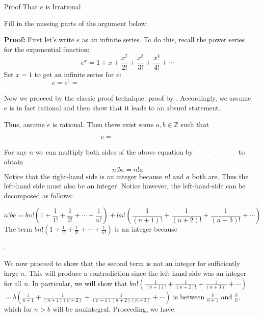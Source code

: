 \begin{exercise}{Proof That $e$ is Irrational \Coffeecup \Coffeecup \Coffeecup}

Fill in the missing parts of the argument below:

\vspace*{.2in}

{\bf Proof:} First let's write $e$ as an infinite series.  To do this, recall the power series for the exponential function:  $$ e^x = 1+x+\frac{x^2}{2!}+\frac{x^3}{3!}+\frac{x^4}{4!}+ \cdots $$ Set $x=1$ to get an infinite series for $e$: $$ e=e^1= \underline{\hspace{3in}}$$

Now we proceed by the classic proof technique: proof by \underline{\hspace{1in}}. Accordingly, we assume $e$ is in fact rational and then show that it leads to an absurd statement.

Thus, assume $e$ is rational.  Then there exist some $a,b \in \mathbb{Z}$ such that

$$ e = \underline{\hspace{1in}} $$

For any $n$ we can multiply both sides of the above equation by $\underline{\hspace{1in}}$ to obtain $$ n!be=n!a  $$  Notice that the right-hand side is an integer because $n!$ and $a$ both are.  Thus the left-hand side must also be an integer.  Notice however, the left-hand-side can be decomposed as follows:

$$ n!be=bn!\left( 1+\frac{1}{1!}+\frac{1}{2!}+\cdots +\frac{1}{n!}\right) + bn!\left(\frac{1}{(n+1)!} +\frac{1}{(n+2)!}+\frac{1}{(n+3)!}+\cdots\right)$$ The term $bn!\left( 1+\frac{1}{1!}+\frac{1}{2!}+\cdots +\frac{1}{n!}\right)$ is an integer because 

\vspace{.1in}

\underline{\hspace{2.5in}}.

\vspace{.1in}

We now proceed to show that the second term is not an integer for sufficiently large $n$.  This will produce a contradiction since the left-hand side was an integer for all $n$.  In particular, we will show that  $bn!\left(\frac{1}{(n+1)!} +\frac{1}{(n+2)!}+\frac{1}{(n+3)!}+\cdots\right)$ $=b\left( \frac{1}{n+1}+ \frac{1}{(n+1)(n+2)}+\frac{1}{(n+1)(n+2)(n+3)}+\cdots\right)$ is between $\frac{b}{n+1}$ and 
$\frac{b}{n}$, which for $n>b$ will be nonintegral.  Proceeding, we have:


\end{exercise}
